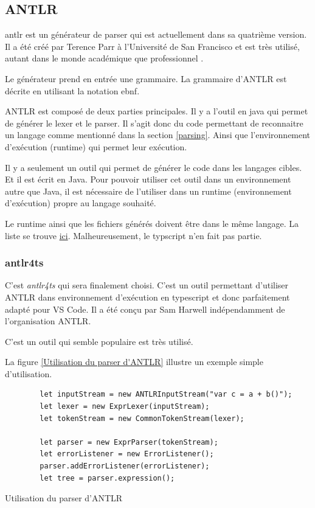 \documentclass[
    iict, %
    il, %
]{heig-tb}
\begin{document}
\subsection{ANTLR}

\Gls{antlr} est un générateur de parser qui est actuellement dans sa quatrième version.
Il a été créé par Terence Parr à l'Université de San Francisco et est très utilisé, autant dans le monde académique que professionnel \cite{antlr}.

Le générateur prend en entrée une grammaire. La grammaire d'ANTLR est décrite en utilisant la notation \Gls{ebnf}.

ANTLR est composé de deux parties principales. Il y a l'outil en java qui permet de générer le lexer et le parser. Il s'agit donc du code permettant de reconnaitre un langage comme mentionné dans la section \ref{parsing}.
Ainsi que l'environnement d'exécution (runtime) qui permet leur exécution.

Il y a seulement un outil qui permet de générer le code dans les langages cibles. Et il est écrit en Java.
Pour pouvoir utiliser cet outil dans un environnement autre que Java, il est nécessaire de l'utiliser dans un runtime (environnement d'exécution) propre au langage souhaité.

Le runtime ainsi que les fichiers générés doivent être dans le même langage. La liste se trouve \href{https://github.com/antlr/antlr4/blob/master/doc/targets.md}{ici}.
Malheureusement, le typscript n'en fait pas partie.

\subsubsection{antlr4ts}
C'est \emph{antlr4ts} qui sera finalement choisi. C'est un outil permettant d'utiliser ANTLR dans environnement d'exécution en typescript et donc parfaitement adapté pour VS Code.
Il a été conçu par Sam Harwell indépendamment de l'organisation ANTLR.


C'est un outil qui semble populaire est très utilisé.

La figure \ref{Utilisation du parser d'ANTLR} illustre un exemple simple d'utilisation.

\begin{listing}[!ht]
    \begin{verbatim}
        let inputStream = new ANTLRInputStream("var c = a + b()");
        let lexer = new ExprLexer(inputStream);
        let tokenStream = new CommonTokenStream(lexer);

        let parser = new ExprParser(tokenStream);
        let errorListener = new ErrorListener();
        parser.addErrorListener(errorListener);
        let tree = parser.expression();
    \end{verbatim}
    \caption{Utilisation du parser d'ANTLR}
    \label{Utilisation du parser d'ANTLR}
\end{listing}
\end{document}
